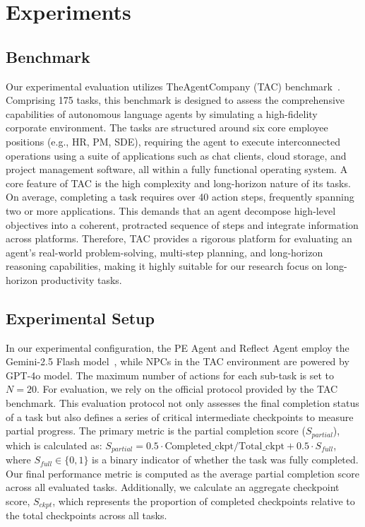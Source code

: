 \section{Experiments}

\subsection{Benchmark}

Our experimental evaluation utilizes TheAgentCompany (TAC) benchmark~\citep{xu2024theagentcompanybenchmarkingllmagents}. Comprising 175 tasks, this benchmark is designed to assess the comprehensive capabilities of autonomous language agents by simulating a high-fidelity corporate environment. The tasks are structured around six core employee positions (e.g., HR, PM, SDE), requiring the agent to execute interconnected operations using a suite of applications such as chat clients, cloud storage, and project management software, all within a fully functional operating system.
A core feature of TAC is the high complexity and long-horizon nature of its tasks. On average, completing a task requires over 40 action steps, frequently spanning two or more applications. This demands that an agent decompose high-level objectives into a coherent, protracted sequence of steps and integrate information across platforms. Therefore,  TAC provides a rigorous platform for evaluating an agent's real-world problem-solving, multi-step planning, and long-horizon reasoning capabilities, making it highly suitable for our research focus on long-horizon productivity tasks.


\subsection{Experimental Setup}
\label{sec:ex_setup}

In our experimental configuration, the PE Agent and Reflect Agent employ the Gemini-2.5 Flash model~\citep{comanici2025gemini}, while NPCs in the TAC environment are powered by GPT-4o model. The maximum number of actions for each sub-task is set to $N=20$. For evaluation, we rely on the official protocol provided by the TAC benchmark. This evaluation protocol not only assesses the final completion status of a task but also defines a series of critical intermediate checkpoints to measure partial progress. The primary metric is the partial completion score ($S_{partial}$), which is calculated as:
$S_{partial} = 0.5 \cdot {\text{Completed\_ckpt}} / {\text{Total\_ckpt}} + 0.5 \cdot S_{full}$,
where $S_{full} \in \{0,1\}$ is a binary indicator of whether the task was fully completed. Our final performance metric is computed as the average partial completion score across all evaluated tasks. Additionally, we calculate an aggregate checkpoint score, $S_{ckpt}$, which represents the proportion of completed checkpoints relative to the total checkpoints across all tasks.

